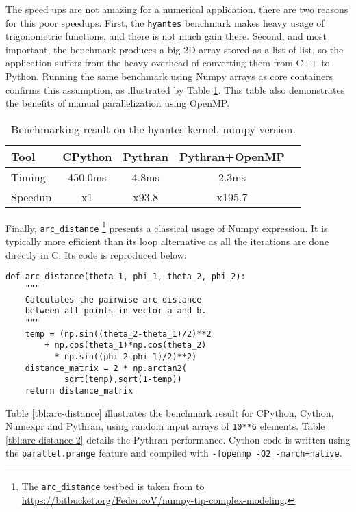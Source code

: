 \documentclass[10pt, onecolumn, preprint]{sigplanconf}
\begin{document}
The speed ups are not amazing for a numerical application. there are two
reasons for this poor speedups. First, the \texttt{hyantes} benchmark makes heavy
usage of trigonometric functions, and there is not much gain there. Second, and
most important, the benchmark produces a big 2D array stored as a list of list,
so the application suffers from the heavy overhead of converting them from C++
to Python. Running the same benchmark using Numpy arrays as core containers
confirms this assumption, as illustrated by Table \ref{tbl:np-hyantes}. This
table also demonstrates the benefits of manual parallelization using OpenMP.


\begin{table}
    \centering

    \begin{tabular}{|l|c|c|c|c|}

        \hline
     Tool    &  CPython    &   Pythran     & Pythran+OpenMP   \\
    \hline
     Timing  &  450.0ms    &   4.8ms       &      2.3ms       \\
    \hline
     Speedup &  x1         &    x93.8      &    x195.7        \\
    \hline
\end{tabular}
\caption{Benchmarking result on the hyantes kernel, numpy version.}
\label{tbl:np-hyantes}
\end{table}

Finally, \texttt{arc\_distance} \footnote{The \texttt{arc\_distance} testbed is taken from to \url{https://bitbucket.org/FedericoV/numpy-tip-complex-modeling}.} presents a classical usage of Numpy expression. It
is typically more efficient than its loop alternative as all the iterations are
done directly in C. Its code is reproduced below:

\begin{lstlisting}
def arc_distance(theta_1, phi_1, theta_2, phi_2):
    """
    Calculates the pairwise arc distance
    between all points in vector a and b.
    """
    temp = (np.sin((theta_2-theta_1)/2)**2
        + np.cos(theta_1)*np.cos(theta_2)
          * np.sin((phi_2-phi_1)/2)**2)
    distance_matrix = 2 * np.arctan2(
            sqrt(temp),sqrt(1-temp))
    return distance_matrix
\end{lstlisting}


Table \ref{tbl:arc-distance} illustrates the benchmark result for CPython,
Cython, Numexpr and Pythran, using random input arrays of \texttt{10**6} elements.
Table \ref{tbl:arc-distance-2} details the Pythran performance. Cython code
is written using the \texttt{parallel.prange} feature and compiled with
\texttt{-fopenmp -O2 -march=native}.
\end{document}

